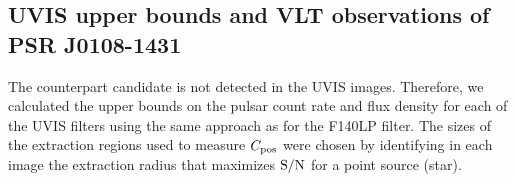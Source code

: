 \documentclass[pdftex,twocolumn]{aastex62}
\newcommand{\gp}[1]{{\color{blue} #1}}
\begin{document}
\subsection{UVIS upper bounds and VLT observations of PSR J0108-1431 \label{UVIS+VLT}}

The counterpart candidate is not detected in the UVIS images.
Therefore, we calculated the upper bounds on the pulsar count rate and flux density  for each of the UVIS filters  using the same approach as for the F140LP filter.
The sizes of the extraction regions used to measure $C_{\rm pos}$ were chosen by identifying in each image 
the extraction radius that maximizes  $\rm S/N$ 
for a point source (star). 
\end{document}
